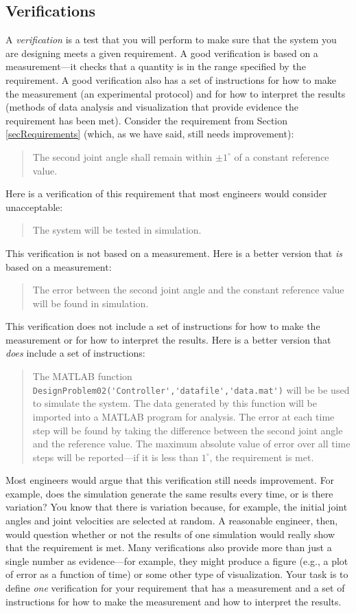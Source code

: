 \documentclass[12pt]{article}
\begin{document}
\subsection{Verifications}
\label{secVerifications}

A {\em verification} is a test that you will perform to make sure that the system you are designing meets a given requirement. A good verification is based on a measurement---it checks that a quantity is in the range specified by the requirement. A good verification also has a set of instructions for how to make the measurement (an experimental protocol) and for how to interpret the results (methods of data analysis and visualization that provide evidence the requirement has been met). Consider the requirement from Section \ref{secRequirements} (which, as we have said, still needs improvement):
\begin{quote}
The second joint angle shall remain within $\pm1^{\circ}$ of a constant reference value.
\end{quote}
Here is a verification of this requirement that most engineers would consider unacceptable:
\begin{quote}
The system will be tested in simulation.
\end{quote}
This verification is not based on a measurement. Here is a better version that {\em is} based on a measurement:
\begin{quote}
The error between the second joint angle and the constant reference value will be found in simulation.
\end{quote}
This verification does not include a set of instructions for how to make the measurement or for how to interpret the results. Here is a better version that {\em does} include a set of instructions:
\begin{quote}
The MATLAB function \lstinline|DesignProblem02('Controller','datafile','data.mat')| will be be used to simulate the system. The data generated by this function will be imported into a MATLAB program for analysis. The error at each time step will be found by taking the difference between the second joint angle and the reference value. The maximum absolute value of error over all time steps will be reported---if it is less than $1^{\circ}$, the requirement is met.
\end{quote}
Most engineers would argue that this verification still needs improvement. For example, does the simulation generate the same results every time, or is there variation? You know that there is variation because, for example, the initial joint angles and joint velocities are selected at random. A reasonable engineer, then, would question whether or not the results of one simulation would really show that the requirement is met. Many verifications also provide more than just a single number as evidence---for example, they might produce a figure (e.g., a plot of error as a function of time) or some other type of visualization. Your task is to define {\em one} verification for your requirement that has a measurement and a set of instructions for how to make the measurement and how to interpret the results.
\end{document}
